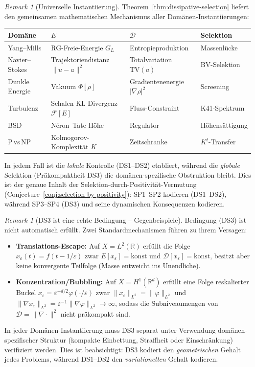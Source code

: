 \documentclass[12pt,a4paper]{article}
\theoremstyle{definition}
\theoremstyle{remark}
\newtheorem{remark}[theorem]{Remark}
\begin{document}
\begin{remark}[Universelle Instantiierung]\label{rem:dissipative-instantiation}
Theorem~\ref{thm:dissipative-selection} liefert den gemeinsamen mathematischen Mechanismus aller Dom\"anen-Instantiierungen:
\begin{center}
\begin{tabular}{llll}
\textbf{Dom\"ane} & $E$ & $\mathcal{D}$ & \textbf{Selektion} \\
\hline
Yang--Mills & RG-Freie-Energie $G_L$ & Entropieproduktion & Massenlücke \\
Navier--Stokes & Trajektoriendistanz $\|u-a\|^2$ & Totalvariation $\mathrm{TV}(a)$ & BV-Selektion \\
Dunkle Energie & Vakuum $\Phi[\rho]$ & Gradientenenergie $|\nabla\rho|^2$ & Screening \\
Turbulenz & Schalen-KL-Divergenz $\mathcal{F}[E]$ & Fluss-Constraint & K41-Spektrum \\
BSD & N\'eron--Tate-H\"ohe & Regulator & H\"ohens\"attigung \\
P\,vs\,NP & Kolmogorov-Komplexit\"at $K$ & Zeitschranke & $K^t$-Transfer \\
\end{tabular}
\end{center}
In jedem Fall ist die \emph{lokale} Kontrolle (DS1--DS2) etabliert, w\"ahrend die \emph{globale} Selektion (Pr\"akompaktheit DS3) die dom\"anen-spezifische Obstruktion bleibt. Dies ist der genaue Inhalt der Selektion-durch-Positivit\"at-Vermutung (Conjecture~\ref{conj:selection-by-positivity}): SP1--SP2 kodieren (DS1--DS2), w\"ahrend SP3--SP4 (DS3) und seine dynamischen Konsequenzen kodieren.
\end{remark}

\begin{remark}[DS3 ist eine echte Bedingung -- Gegenbeispiele]\label{rem:ds3-failure}
Bedingung (DS3) ist nicht automatisch erf\"ullt. Zwei Standardmechanismen f\"uhren zu ihrem Versagen:
\begin{itemize}
\item \textbf{Translations-Escape:} Auf $X = L^2(\mathbb{R})$ erf\"ullt die Folge $x_\varepsilon(t) = f(t - 1/\varepsilon)$ zwar $E[x_\varepsilon] = \mathrm{konst}$ und $\mathcal{D}[x_\varepsilon] = \mathrm{konst}$, besitzt aber keine konvergente Teilfolge (Masse entweicht ins Unendliche).
\item \textbf{Konzentration/Bubbling:} Auf $X = H^1(\mathbb{R}^d)$ erf\"ullt eine Folge reskalierter Buckel $x_\varepsilon = \varepsilon^{-d/2} \varphi(\cdot/\varepsilon)$ zwar $\|x_\varepsilon\|_{L^2} = \|\varphi\|_{L^2}$ und $\|\nabla x_\varepsilon\|_{L^2} = \varepsilon^{-1}\|\nabla\varphi\|_{L^2} \to \infty$, sodass die Subniveaumengen von $\mathcal{D} = \|\nabla \cdot\|^2$ nicht pr\"akompakt sind.
\end{itemize}
In jeder Dom\"anen-Instantiierung muss DS3 separat unter Verwendung dom\"anen-spezifischer Struktur (kompakte Einbettung, Straffheit oder Einschr\"ankung) verifiziert werden. Dies ist beabsichtigt: DS3 kodiert den \emph{geometrischen} Gehalt jedes Problems, w\"ahrend DS1--DS2 den \emph{variationellen} Gehalt kodieren.
\end{remark}
\end{document}

